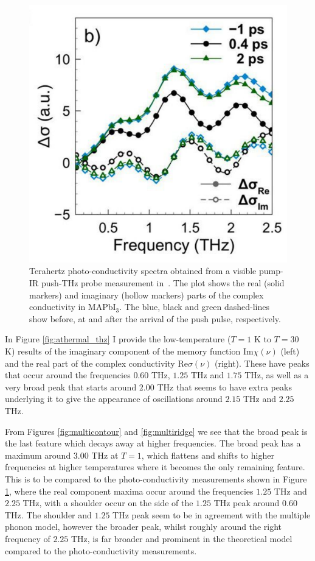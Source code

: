 \begin{figure}[t]  
    \centering
    \includegraphics[width=.7\textwidth]{figures/thz_plot.pdf}
    
    \caption{Terahertz photo-conductivity spectra obtained from a visible pump-IR push-THz probe measurement in~\cite{zheng_multipulse_2021}. The plot shows the real (solid markers) and imaginary (hollow markers) parts of the complex conductivity in MAPbI$_3$. The blue, black and green dashed-lines show before, at and after the arrival of the push pulse, respectively.}
    \label{fig:thzplot}
\end{figure}

In Figure \ref{fig:athermal_thz} I provide the low-temperature ($T = 1$ 
K to $T = 30$ K) results of the imaginary component of the memory function $\text{Im}\chi(\nu)$ (left) and the real part of the complex conductivity $\text{Re}\sigma(\nu)$ (right). These have peaks that occur around the frequencies $0.60$ THz, $1.25$ THz and $1.75$ THz, as well as a very broad peak that starts around $2.00$ THz that seems to have extra peaks underlying it to give the appearance of oscillations around $2.15$ THz and $2.25$ THz. 

From Figures \ref{fig:multicontour} and \ref{fig:multiridge} we see that the broad peak is the last feature which decays away at higher frequencies. The broad peak has a maximum around $3.00$ THz at $T = 1$, which flattens and shifts to higher frequencies at higher temperatures where it becomes the only remaining feature. This is to be compared to the photo-conductivity measurements shown in Figure \ref{fig:thzplot}, where the real component maxima occur around the frequencies $1.25$ THz and $2.25$ THz, with a shoulder occur on the side of the $1.25$ THz peak around $0.60$ THz. The shoulder and $1.25$ THz peak seem to be in agreement with the multiple phonon model, however the broader peak, whilst roughly around the right frequency of $2.25$ THz, is far broader and prominent in the theoretical model compared to the photo-conductivity measurements. 

